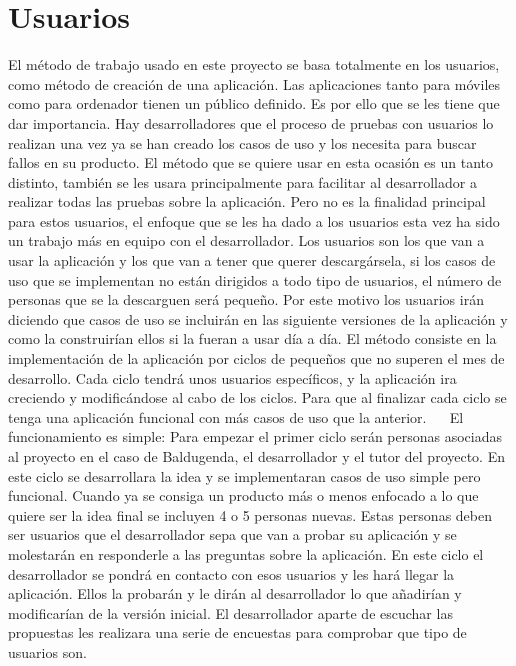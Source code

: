 \chapter{Usuarios}
\label{ch:Usuarios}



El método de trabajo usado en este proyecto se basa totalmente en los usuarios, como método de creación de una aplicación. Las aplicaciones tanto para móviles como para ordenador tienen un público definido. Es por ello que se les tiene que dar importancia.
Hay desarrolladores que el proceso de pruebas con usuarios lo realizan una vez ya se han creado los casos de uso y los necesita para buscar fallos en su producto. El método que se quiere usar en esta ocasión es un tanto distinto, también se les usara principalmente para facilitar al desarrollador a realizar todas las pruebas sobre la aplicación. Pero no es la finalidad principal para estos usuarios, el enfoque que se les ha dado a los usuarios esta vez ha sido un trabajo más en equipo con el desarrollador.
Los usuarios son los que van a usar la aplicación y los que van a tener que querer descargársela, si los casos de uso que se implementan no están dirigidos a todo tipo de usuarios, el número de personas que se la descarguen será pequeño.
Por este motivo los usuarios irán diciendo que casos de uso se incluirán en las siguiente versiones de la aplicación y como la construirían ellos si la fueran a usar día a día.
El método consiste en la implementación de la aplicación por ciclos de pequeños que no superen el mes de desarrollo.
Cada ciclo tendrá unos usuarios específicos, y la aplicación ira creciendo y modificándose al cabo de los ciclos. Para que al finalizar cada ciclo se tenga una aplicación funcional con más casos de uso que la anterior.
 
El funcionamiento es simple:
Para empezar el primer ciclo serán personas asociadas al proyecto en el caso de Baldugenda, el desarrollador y el tutor del proyecto.
En este ciclo se desarrollara la idea y se implementaran casos de uso simple pero funcional.
Cuando ya se consiga un producto más o menos enfocado a lo que quiere ser la idea final se incluyen 4 o 5 personas nuevas. Estas personas deben ser usuarios que el desarrollador sepa que van a probar su aplicación y se molestarán en responderle a las preguntas sobre la aplicación. 
En este ciclo el desarrollador se pondrá en contacto con esos usuarios y les hará llegar la aplicación. Ellos la probarán y le dirán al desarrollador lo que añadirían y modificarían de la versión inicial. El desarrollador aparte de escuchar las propuestas les realizara una serie de encuestas para comprobar que tipo de usuarios son.
